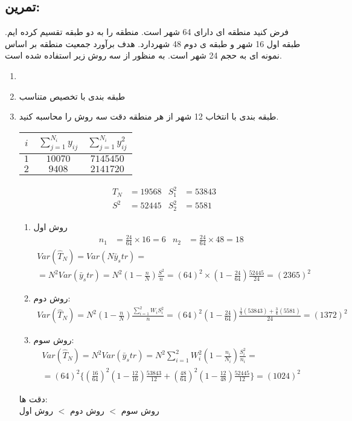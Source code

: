 \subsection*{تمرین:}
فرض کنید منطقه ای دارای 64 شهر است. منطقه را به دو طبقه تقسیم کرده ایم. طبقه اول 16 شهر و طبقه ی دوم 48 شهردارد.
هدف برآورد جمعیت منطقه بر اساس نمونه ای به حجم 24 شهر است. به منظور از سه روش زیر استفاده شده است.
\begin{enumerate}
	\item {}
	\item طبقه بندی با تخصیص متناسب
	\item طبقه بندی با انتخاب 12 شهر از هر منطقه
	دقت سه روش را محاسبه کنید.
	\\
	\begin{LTR}
		\begin{tabular}{c|cc}
			$i$ & $\sum_{j=1}^{N_i}y_{ij}$ & $\sum_{j=1}^{N_i}y_{ij}^2$ \\
			\hline
			$1$ & $10070$ & $7145450$ \\
			$2$ & $9408$ & $2141720$
		\end{tabular}
	\end{LTR}
	\begin{align*}
		T_N&=19568 & S_1^2&=53843 \\
		S^2&=52445 & S_2^2&=5581
	\end{align*}
	\begin{enumerate}
		\item روش اول
		\\
		\begin{align*}
			n_1&=\frac{24}{64}\times 16=6 & n_2&=\frac{24}{64}\times 48=18
		\end{align*}
		\begin{multline*}
			Var(\hat{T}_N)=Var(N\bar{y}_str)
			=\\=
			N^2Var(\bar{y}_str)=N^2(1-\frac{n}{N})\frac{S^2}{n}
			=(64)^2\times (1-\frac{24}{64})\frac{52445}{24}=(2365)^2
		\end{multline*}
		\item  روش دوم:
		\\
		\begin{multline*}
			Var(\hat{T}_N)=N^2(1-\frac{n}{N})\frac{\sum_{i=1}^{2}W_iS_i^2}{n}
			=(64)^2(1-\frac{24}{64})\frac{\frac{1}{4}(53843)+\frac{3}{4}(5581)}{24}
			=(1372)^2
		\end{multline*}
		\item روش سوم:
		\begin{multline*}
			Var(\hat{T}_N)=N^2Var(\bar{y}_str)=
			N^2\sum_{i=1}^{2}W_i^2(1-\frac{n_i}{N_i})\frac{S_i^2}{n_i}
			=\\=
			(64)^2\{(\frac{16}{64})^2(1-\frac{12}{16})\frac{53843}{12}+(\frac{48}{64})^2(1-\frac{12}{48})\frac{52445}{12}\}=(1024)^2
		\end{multline*}
	\end{enumerate}
	دقت ها:
	\\
	روش سوم
	$<$
	روش دوم
	$<$
	روش اول

\end{enumerate}
